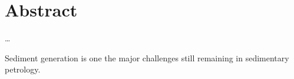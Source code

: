 \chapter{Abstract}                                 \label{ch:abstract}

\ldots

Sediment generation is one the major challenges still remaining in sedimentary petrology.

\instructionsabstract


\cleardoublepage

